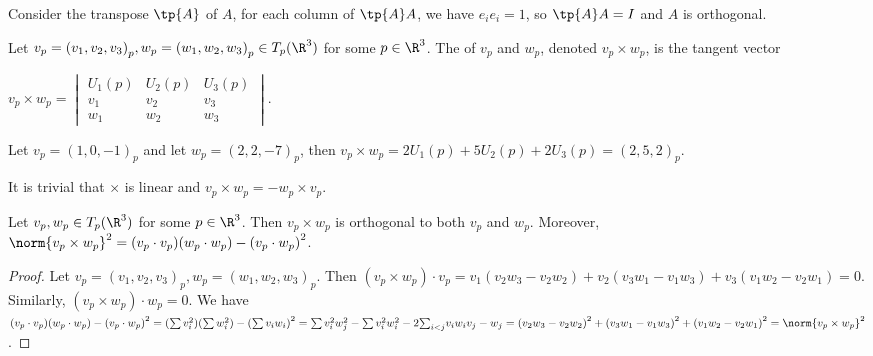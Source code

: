 \documentclass[10pt]{article}
\begin{document}
\par
Consider the transpose $\tp{A}$ of $A$, for each column of $\tp{A}A$, we have ${e}_{i}{e}_{i}=1$, so $\tp{A}A=I$ and $A$ is orthogonal.
\begin{definition}
    Let ${v}_{p}={({v}_{1},{v}_{2},{v}_{3})}_{p},{w}_{p}={({w}_{1},{w}_{2},{w}_{3})}_{p}\in{T}_{p}({\R}^{3})$ for some $p\in{\R}^{3}$. The  of ${v}_{p}$ and ${w}_{p}$, denoted ${v}_{p}\times{w}_{p}$, is the tangent vector
    \begin{center}
        ${v}_{p}\times{w}_{p}=\begin{vmatrix}
            {U}_{1}(p) & {U}_{2}(p) & {U}_{3}(p) \\
            {v}_{1} & {v}_{2} & {v}_{3} \\
            {w}_{1} & {w}_{2} & {w}_{3} 
        \end{vmatrix}$.
    \end{center}
\end{definition}
\begin{example}
    Let ${v}_{p}={(1,0,-1)}_{p}$ and let ${w}_{p}={(2,2,-7)}_{p}$, then ${v}_{p}\times{w}_{p}=2{U}_{1}(p)+5{U}_{2}(p)+2{U}_{3}(p)={(2,5,2)}_{p}$.
\end{example}
\par
It is trivial that $\times$ is linear and ${v}_{p}\times{w}_{p}=-{w}_{p}\times{v}_{p}$.
\begin{proposition}
    Let ${v}_{p},{w}_{p}\in{T}_{p}({\R}^{3})$ for some $p\in{\R}^{3}$. Then ${v}_{p}\times{w}_{p}$ is orthogonal to both ${v}_{p}$ and ${w}_{p}$. Moreover, ${\norm{{v}_{p}\times{w}_{p}}}^{2}=({v}_{p}\cdot{v}_{p})({w}_{p}\cdot{w}_{p})-{({v}_{p}\cdot{w}_{p})}^{2}$.
\end{proposition}
\begin{proof}
    Let ${v}_{p}={({v}_{1},{v}_{2},{v}_{3})}_{p},{w}_{p}={({w}_{1},{w}_{2},{w}_{3})}_{p}$. Then $({v}_{p}\times{w}_{p})\cdot{v}_{p}={v}_{1}({v}_{2}{w}_{3}-{v}_{2}{w}_{2})+{v}_{2}({v}_{3}{w}_{1}-{v}_{1}{w}_{3})+{v}_{3}({v}_{1}{w}_{2}-{v}_{2}{w}_{1})=0$. Similarly, $({v}_{p}\times{w}_{p})\cdot{w}_{p}=0$. We have $({v}_{p}\cdot{v}_{p})({w}_{p}\cdot{w}_{p})-{({v}_{p}\cdot{w}_{p})}^{2}=(\sum{v}_{i}^{2})(\sum{w}_{i}^{2})-{(\sum{v}_{i}{w}_{i})}^{2}=\sum{v}_{i}^{2}{w}_{j}^{2}-\sum{v}_{i}^{2}{w}_{i}^{2}-2{\sum}_{i<j}{v}_{i}{w}_{i}{v}_{j}-{w}_{j}={({v}_{2}{w}_{3}-{v}_{2}{w}_{2})}^{2}+{({v}_{3}{w}_{1}-{v}_{1}{w}_{3})}^{2}+{({v}_{1}{w}_{2}-{v}_{2}{w}_{1})}^{2}={\norm{{v}_{p}\times{w}_{p}}}^{2}$.
\end{proof}
\end{document}
